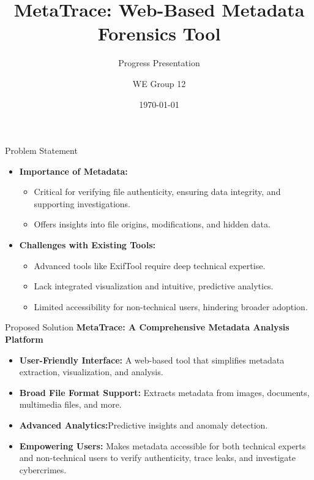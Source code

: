 \documentclass{beamer}
\title{MetaTrace: Web-Based Metadata Forensics Tool}
\subtitle{Progress Presentation}
\author{WE Group 12}
\date{\today}
\begin{document}
\begin{frame}
    \titlepage
\end{frame}

\begin{frame}{Problem Statement}
    \begin{itemize}
        \item \textbf{Importance of Metadata:}
        \begin{itemize}
            \item Critical for verifying file authenticity, ensuring data integrity, and supporting investigations.
            \item Offers insights into file origins, modifications, and hidden data.
        \end{itemize}
        \item \textbf{Challenges with Existing Tools:}
        \begin{itemize}
            \item Advanced tools like ExifTool require deep technical expertise.
            \item Lack integrated visualization and intuitive, predictive analytics.
            \item Limited accessibility for non-technical users, hindering broader adoption.
        \end{itemize}
    \end{itemize}
\end{frame}

\begin{frame}{Proposed Solution}
    \textbf{MetaTrace: A Comprehensive Metadata Analysis Platform}
    \begin{itemize}
        \item \textbf{User-Friendly Interface:} A web-based tool that simplifies metadata extraction, visualization, and analysis.
        \item \textbf{Broad File Format Support:} Extracts metadata from images, documents, multimedia files, and more.
        \item \textbf{Advanced Analytics:}Predictive insights and anomaly detection.
        \item \textbf{Empowering Users:} Makes metadata accessible for both technical experts and non-technical users to verify authenticity, trace leaks, and investigate cybercrimes.
    \end{itemize}
\end{frame}
\end{document}
